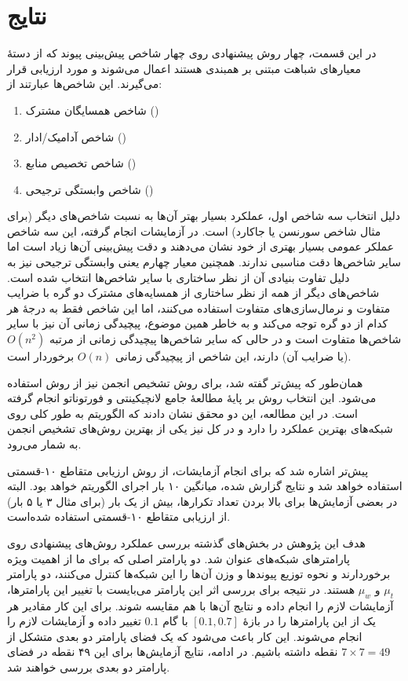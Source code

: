 \section{نتایج}
در این قسمت، چهار روش پیشنهادی روی چهار شاخص پیش‌بینی پیوند که از دستهٔ معیارهای شباهت مبتنی بر همبندی هستند اعمال می‌شوند و مورد ارزیابی قرار می‌گیرند. این شاخص‌ها عبارتند از:

{ \onehalfspacing
\begin{enumerate}
  \item شاخص همسایگان مشترک ()
  \item شاخص آدامیک/ادار ()
  \item شاخص تخصیص منابع ()
  \item شاخص وابستگی ترجیحی ()
\end{enumerate}
}

دلیل انتخاب سه شاخص اول، عملکرد بسیار بهتر آن‌ها به نسبت شاخص‌های دیگر (برای مثال شاخص سورنسن یا جاکارد) است. در آزمایشات انجام گرفته، این سه شاخص عملکر عمومی بسیار بهتری از خود نشان می‌دهند و دقت پیش‌بینی آن‌ها زیاد است اما سایر شاخص‌ها دقت مناسبی ندارند. همچنین معیار چهارم یعنی وابستگی ترجیحی نیز به دلیل تفاوت بنیادی آن از نظر ساختاری با سایر شاخص‌ها انتخاب شده است. شاخص‌های دیگر از همه از نظر ساختاری از همسایه‌های مشترک دو گره با ضرایب متفاوت و نرمال‌سازی‌های متفاوت استفاده می‌کنند، اما این شاخص فقط به درجهٔ هر کدام از دو گره توجه می‌کند و به خاطر همین موضوع، پیچیدگی زمانی آن نیز با سایر شاخص‌ها متفاوت است و در حالی که سایر شاخص‌ها پیچیدگی زمانی از مرتبه $O(n^2)$ (یا ضرایب آن) دارند، این شاخص از پیچیدگی زمانی $O(n)$ برخوردار است.

همان‌طور که پیش‌تر گفته شد، برای روش تشخیص انجمن نیز از روش \Infomap استفاده می‌شود. این انتخاب روش بر پایهٔ مطالعهٔ جامع لانچیکینتی و فورتوناتو \cite{lancichinetti2009community} انجام گرفته است. در این مطالعه، این دو محقق نشان دادند که الگوریتم \Infomap به طور کلی روی شبکه‌های  بهترین عملکرد را دارد و در کل نیز یکی از بهترین روش‌های تشخیص انجمن به شمار می‌رود.

پیش‌تر اشاره شد که برای انجام آزمایشات، از روش ارزیابی متقاطع ۱۰-قسمتی استفاده خواهد شد و نتایج گزارش شده، میانگین ۱۰ بار اجرای الگوریتم خواهد بود. البته در بعضی آزمایش‌ها برای بالا بردن تعداد تکرارها، بیش از یک بار (برای مثال ۳ یا ۵ بار) از ارزیابی متقاطع ۱۰-قسمتی استفاده شده‌است.

هدف این پژوهش در بخش‌های گذشته بررسی عملکرد روش‌های پیشنهادی روی پارامترهای شبکه‌های  عنوان شد. دو پارامتر اصلی که برای ما از اهمیت ویژه برخوردارند و نحوه توزیع پیوندها و وزن آن‌ها را این شبکه‌ها کنترل می‌کنند، دو پارامتر $\mu_t$ و $\mu_w$ هستند. در نتیجه برای بررسی اثر این پارامتر می‌بایست با تغییر این پارامترها، آزمایشات لازم را انجام داده و نتایج آن‌ها با هم مقایسه شوند. برای این کار مقادیر هر یک از این پارامترها را در بازهٔ $[0.1, 0.7]$ با گام $0.1$ تغییر داده و آزمایشات لازم را انجام می‌شوند. این کار باعث می‌شود که یک فضای پارامتر دو بعدی متشکل از $7 \times 7 = 49$ نقطه داشته باشیم. در ادامه، نتایج آزمایش‌ها برای این ۴۹ نقطه در فضای پارامتر دو بعدی بررسی خواهند شد.

